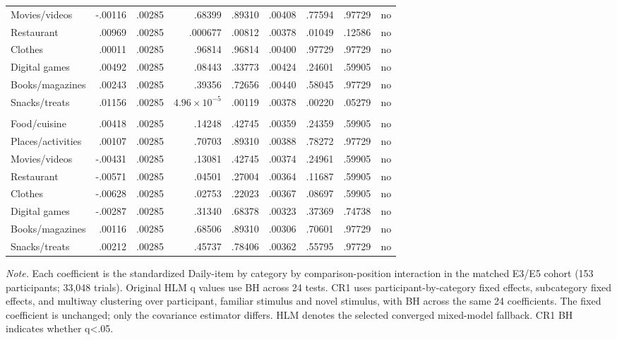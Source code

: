 \begin{longtable}{@{}>{\raggedright\arraybackslash}p{2.25cm}rrrrrrrr@{}}
Movies/videos & -.00116 & .00285 & .68399 & .89310 & .00408 & .77594 & .97729 & no \\
Restaurant & .00969 & .00285 & .000677 & .00812 & .00378 & .01049 & .12586 & no \\
Clothes & .00011 & .00285 & .96814 & .96814 & .00400 & .97729 & .97729 & no \\
Digital games & .00492 & .00285 & .08443 & .33773 & .00424 & .24601 & .59905 & no \\
Books/magazines & .00243 & .00285 & .39356 & .72656 & .00440 & .58045 & .97729 & no \\
Snacks/treats & .01156 & .00285 & \ensuremath{4.96\!\times\!10^{-5}} & .00119 & .00378 & .00220 & .05279 & no \\
\multicolumn{9}{l}{\textbf{Geometry}} \\
Food/cuisine & .00418 & .00285 & .14248 & .42745 & .00359 & .24359 & .59905 & no \\
Places/activities & .00107 & .00285 & .70703 & .89310 & .00388 & .78272 & .97729 & no \\
Movies/videos & -.00431 & .00285 & .13081 & .42745 & .00374 & .24961 & .59905 & no \\
Restaurant & -.00571 & .00285 & .04501 & .27004 & .00364 & .11687 & .59905 & no \\
Clothes & -.00628 & .00285 & .02753 & .22023 & .00367 & .08697 & .59905 & no \\
Digital games & -.00287 & .00285 & .31340 & .68378 & .00323 & .37369 & .74738 & no \\
Books/magazines & .00116 & .00285 & .68506 & .89310 & .00306 & .70601 & .97729 & no \\
Snacks/treats & .00212 & .00285 & .45737 & .78406 & .00362 & .55795 & .97729 & no \\
\end{longtable}
\noindent\begin{minipage}{\textwidth}\footnotesize\textit{Note.} Each coefficient is the standardized Daily-item by category by comparison-position interaction in the matched E3/E5 cohort (153 participants; 33,048 trials). Original HLM q values use BH across 24 tests. CR1 uses participant-by-category fixed effects, subcategory fixed effects, and multiway clustering over participant, familiar stimulus and novel stimulus, with BH across the same 24 coefficients. The fixed coefficient is unchanged; only the covariance estimator differs. HLM denotes the selected converged mixed-model fallback. CR1 BH indicates whether q<.05.\end{minipage}
\endgroup
